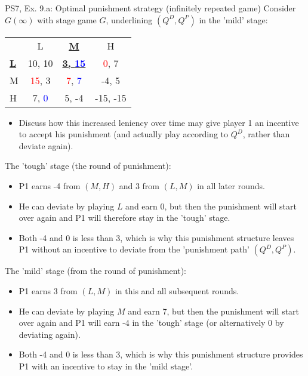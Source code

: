 \begin{frame}{PS7, Ex. 9.a: Optimal punishment strategy (infinitely repeated game)}
    Consider $G(\infty)$ with stage game $G$, underlining $(Q^D,Q^P)$ in the 'mild' stage: \vspace{-6pt}
    \begin{table}
      \begin{tabular}{l|c|c|c|}
        \multicolumn{1}{c}{} & \multicolumn{1}{c}{L} & \multicolumn{1}{c}{\textbf{\underline{M}}} & \multicolumn{1}{c}{H} \\\cline{2-4}
        \textbf{\underline{L}} & 10, 10 & \textbf{\underline{3, \textcolor{blue}{15}}} & \textcolor{red}{0}, 7 \\\cline{2-4}
        M & \textcolor{red}{15}, 3 & \textcolor{red}{7}, \textcolor{blue}{7} & -4, 5 \\\cline{2-4}
        H & 7, \textcolor{blue}{0} & 5, -4 & -15, -15 \\\cline{2-4}
      \end{tabular}
    \end{table}
    \vspace{-6pt}
    \begin{itemize}
      \item[(a)] Discuss how this increased leniency over time may give player 1 an incentive to accept his punishment (and actually play according to $Q^D$, rather than deviate again).
    \end{itemize}
    \vspace{-8pt}
    \begin{multicols}{2}
      The 'tough' stage (the  round of punishment):\vspace{-6pt}
      \begin{itemize}
        \item P1 earns -4 from $(M, H)$ and 3 from $(L, M)$ in all later rounds.
        \item He can deviate by playing $L$ and earn 0, but then the punishment will start over again and P1 will therefore stay in the 'tough' stage.
        \item Both -4 and 0 is less than 3, which is why this punishment structure leaves P1 without an incentive to deviate from the 'punishment path' $(Q^D,Q^P)$.
      \end{itemize}
      \vfill\null\columnbreak
      The 'mild' stage (from the  round of punishment):\vspace{-6pt}
      \begin{itemize}
        \item P1 earns 3 from $(L, M)$ in this and all subsequent rounds.
        \item He can deviate by playing $M$ and earn 7, but then the punishment will start over again and P1 will earn -4 in the 'tough' stage (or alternatively 0 by deviating again).
        \item Both -4 and 0 is less than 3, which is why this punishment structure provides P1 with an incentive to stay in the 'mild stage'.
      \end{itemize}
      \vfill\null
    \end{multicols}
\end{frame}

